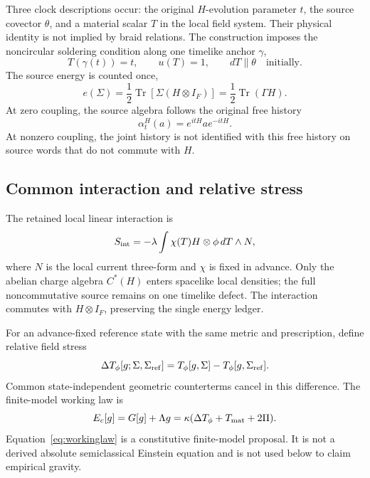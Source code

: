 \documentclass[12pt,a4paper,twoside]{article}
\begin{document}
Three clock descriptions occur: the original $H$-evolution parameter $t$, the source covector $\theta$, and a material scalar $T$ in the local field system. Their physical identity is not implied by braid relations. The construction imposes the noncircular soldering condition along one timelike anchor $\gamma$,
\begin{equation}
T(\gamma(t))=t,
\qquad u(T)=1,
\qquad dT\parallel\theta\quad\text{initially}.
\end{equation}
The source energy is counted once,
\begin{equation}
e(\Sigma)=\frac12\operatorname{Tr}[\Sigma(H\otimes I_F)]
=\frac12\operatorname{Tr}(\Gamma H).
\end{equation}
At zero coupling, the source algebra follows the original free history
\begin{equation}
\alpha_t^H(a)=e^{itH}ae^{-itH}.
\end{equation}
At nonzero coupling, the joint history is not identified with this free history on source words that do not commute with $H$.

\subsection{Common interaction and relative stress}

The retained local linear interaction is
\begin{equation}
S_{\rm int}=-\lambda\int \chi(T)H\otimes\phi\,dT\wedge N,
\label{eq:interaction}
\end{equation}
where $N$ is the local current three-form and $\chi$ is fixed in advance. Only the abelian charge algebra $C^*(H)$ enters spacelike local densities; the full noncommutative source remains on one timelike defect. The interaction commutes with $H\otimes I_F$, preserving the single energy ledger.

For an advance-fixed reference state with the same metric and prescription, define relative field stress
\begin{equation}
\Delta T_\phi[g;\Sigma,\Sigma_{\rm ref}]
=T_\phi[g,\Sigma]-T_\phi[g,\Sigma_{\rm ref}].
\end{equation}
Common state-independent geometric counterterms cancel in this difference. The finite-model working law is
\begin{equation}
E_c[g]=G[g]+\Lambda g
=\kappa(\Delta T_\phi+T_{\rm mat}+2\Pi).
\label{eq:workinglaw}
\end{equation}
Equation~\eqref{eq:workinglaw} is a constitutive finite-model proposal. It is not a derived absolute semiclassical Einstein equation and is not used below to claim empirical gravity.
\end{document}
